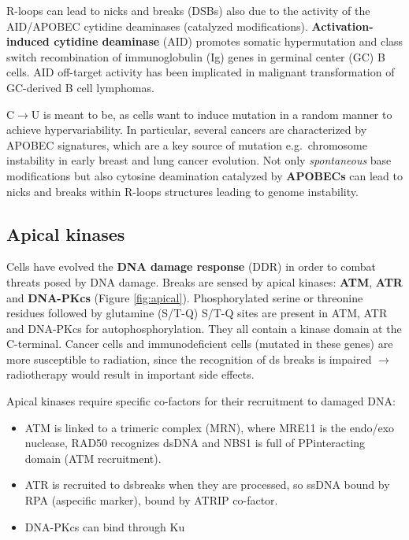 R-loops can lead to nicks and breaks (DSBs) also due to the activity of the AID/APOBEC cytidine deaminases (catalyzed modifications). \textbf{Activation-induced cytidine deaminase} (AID) promotes somatic hypermutation and class switch recombination of immunoglobulin (Ig) genes in germinal center (GC) B cells. AID off-target activity has been implicated in malignant transformation of GC-derived B cell lymphomas.

C$\rightarrow$U is meant to be, as cells want to induce mutation in a random manner to achieve hypervariability. In particular, several cancers are characterized by APOBEC signatures, which are a key source of mutation e.g.~chromosome instability in early breast and lung cancer evolution. Not only \emph{spontaneous} base modifications but also cytosine deamination catalyzed by \textbf{APOBECs} can lead to nicks and breaks within R-loops structures leading to genome instability.

\hypertarget{apical-kinases}{%
\subsection{Apical kinases}\label{apical-kinases}}

Cells have evolved the \textbf{DNA damage response} (DDR) in order to combat threats
posed by DNA damage. Breaks are sensed by apical kinases: \textbf{ATM}, \textbf{ATR} and \textbf{DNA-PKcs} (Figure \ref{fig:apical}). Phosphorylated serine or threonine residues followed by glutamine (S/T-Q) S/T-Q sites are present in ATM, ATR and DNA-PKcs for autophosphorylation. They all contain a kinase domain at the C-terminal. Cancer cells and immunodeficient cells (mutated in these genes) are more susceptible to radiation, since the recognition of ds breaks is impaired $\rightarrow$ radiotherapy would result in important side effects.

Apical kinases require specific co-factors for their recruitment to
damaged DNA:
\begin{itemize}
\tightlist
\item ATM is linked to a trimeric complex (MRN), where MRE11 is the endo/exo nuclease, RAD50 recognizes dsDNA and NBS1 is full of PPinteracting domain (ATM recruitment). 
\item ATR is recruited to dsbreaks when they are processed, so ssDNA bound by RPA (aspecific marker), bound by ATRIP co-factor.
\item DNA-PKcs can bind through Ku
\end{itemize}

